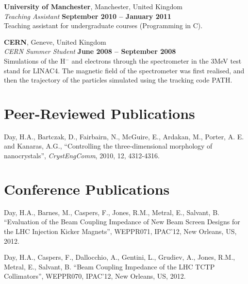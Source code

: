 \documentclass[margin,line]{resume}
\begin{document}
\begin{resume}
    \textbf{University of Manchester}, Manchester, United Kingdom \vspace{2mm}\\\vspace{1mm}%
    \textsl{Teaching Assistant} \hfill \textbf{September 2010 -- January 2011}\\
    Teaching assistant for undergraduate courses (Programming in C).

    \textbf{CERN}, Geneve, United Kingdom \vspace{2mm}\\\vspace{1mm}%
    \textsl{CERN Summer Student} \hfill \textbf{June 2008 -- September 2008}\\
    Simulations of the H$^{-}$ and electrons through the spectrometer in the 3MeV test stand for LINAC4. The magnetic field of the spectrometer was first realised, and then the trajectory of the particles simulated using the tracking code PATH.


    \section{\mysidestyle Peer-Reviewed Publications}

    
	Day, H.A.,  Bartczak, D.,  Fairbairn, N.,  McGuire, E., Ardakan, M., Porter, A. E. and Kanaras, A.G.,
    ``Controlling the three-dimensional morphology of nanocrystals'',
    \textsl{CrystEngComm}, 2010, 12, 4312-4316.

\vspace{-2mm}


    \section{\mysidestyle Conference Publications}

    
	Day, H.A., Barnes, M., Caspers, F., Jones, R.M., Metral, E., Salvant, B.
    ``Evaluation of the Beam Coupling Impedance of New Beam Screen Designs for the LHC Injection Kicker Magnets'',
    WEPPR071, IPAC'12, New Orleans, US, 2012.

\vspace{-2mm}

	Day, H.A., Caspers, F., Dallocchio, A., Gentini, L., Grudiev, A., Jones, R.M., Metral, E., Salvant, B.
    ``Beam Coupling Impedance of the LHC TCTP Collimators'',
    WEPPR070, IPAC'12, New Orleans, US, 2012.


\end{resume}
\end{document}
